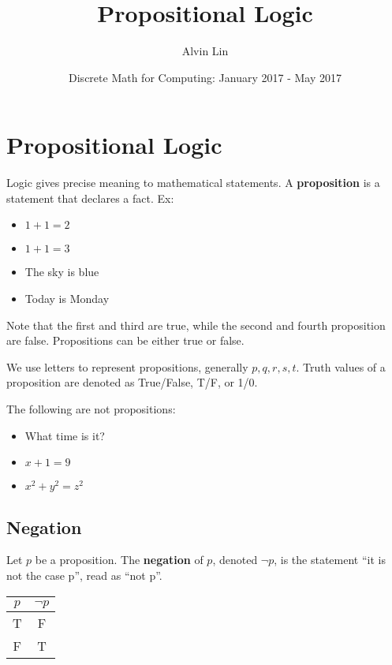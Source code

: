 \documentclass[letterpaper, 12pt]{math}
\title{Propositional Logic}
\author{Alvin Lin}
\date{Discrete Math for Computing: January 2017 - May 2017}
\begin{document}
\maketitle

\section*{Propositional Logic}
Logic gives precise meaning to mathematical statements. A \textbf{proposition}
is a statement that declares a fact. Ex:
\begin{itemize}
  \item \( 1+1 = 2 \)
  \item \( 1+1 = 3 \)
  \item The sky is blue
  \item Today is Monday
\end{itemize}
Note that the first and third are true, while the second and fourth proposition
are false. Propositions can be either true or false. \par
We use letters to represent propositions, generally \(p, q, r, s, t\). Truth
values of a proposition are denoted as True/False, T/F, or 1/0. \par
The following are not propositions:
\begin{itemize}
  \item What time is it?
  \item \( x+1 = 9 \)
  \item \( x^{2}+y^{2} = z^{2} \)
\end{itemize}

\subsection*{Negation}
Let \( p \) be a proposition. The \textbf{negation} of \( p \), denoted
\( \neg{p} \), is the statement ``it is not the case p'', read as ``not p''.
\begin{center}
  \begin{tabular}{|c|c|}
    \hline
    \( p \) & \( \neg{p} \) \\ \hline
    T       & F             \\ \hline
    F       & T             \\ \hline
  \end{tabular}
\end{center}
\end{document}
